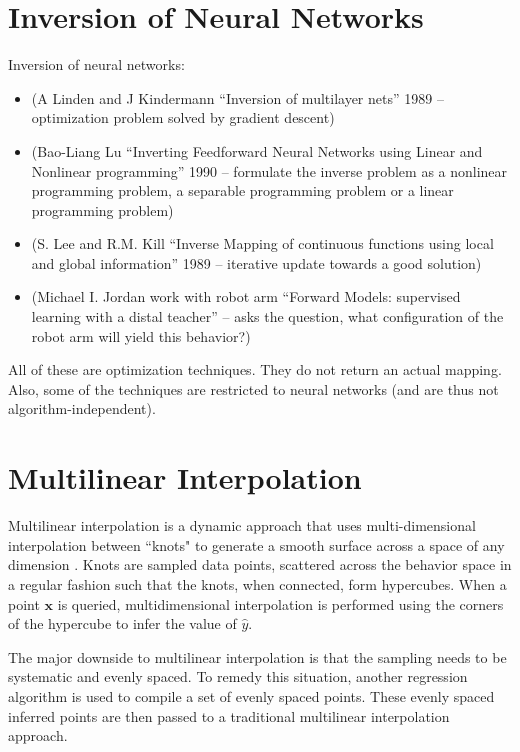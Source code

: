 \section{Inversion of Neural Networks}
Inversion of neural networks: 
\begin{itemize}
\item (A Linden and J Kindermann ``Inversion of multilayer nets'' 1989 -- optimization problem solved by gradient descent) 
\item (Bao-Liang Lu ``Inverting Feedforward Neural Networks using Linear and Nonlinear programming'' 1990 -- formulate the inverse problem as a nonlinear programming problem, a separable programming problem or a linear programming problem)
\item (S. Lee and R.M. Kill ``Inverse Mapping of continuous functions using local and global information'' 1989 -- iterative update towards a good solution)
\item (Michael I. Jordan work with robot arm ``Forward Models: supervised learning with a distal teacher'' -- asks the question, what configuration of the robot arm will yield this behavior?)
\end{itemize}
All of these are optimization techniques. They do not return an actual mapping. Also, some of the techniques are restricted to neural networks (and are thus not algorithm-independent).



\section{Multilinear Interpolation}
\label{sec:multilinear}

Multilinear interpolation is a dynamic approach that uses multi-dimensional interpolation between ``knots" to generate a smooth surface across a space of any dimension \cite{davies1997multidimensional}.
Knots are sampled data points, scattered across the behavior space in a regular fashion such that the knots, when connected, form hypercubes.
When a point $\mathbf x$ is queried, multidimensional interpolation is performed using the corners of the hypercube to infer the value of $\hat y$.

The major downside to multilinear interpolation is that the sampling needs to be systematic and evenly spaced.
To remedy this situation, another regression algorithm is used to compile a set of evenly spaced points.
These evenly spaced inferred points are then passed to a traditional multilinear interpolation approach.

